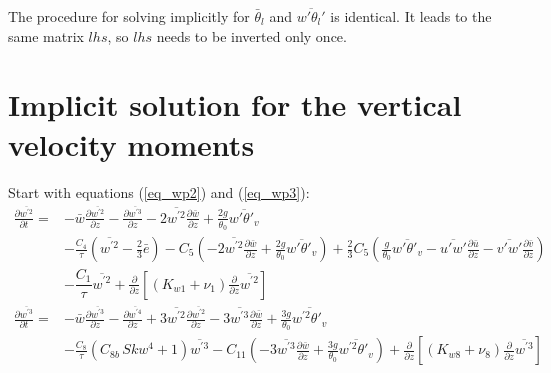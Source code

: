 \documentclass[11pt,fleqn]{article}
\newcommand{\ptlder}[2]{\frac{\partial #1}{\partial #2}}
\begin{document}
The procedure for solving implicitly for $\bar{\theta}_l$ 
and $\overline{w'\theta_l'}$ is identical. It leads to the same matrix
$lhs$, so $lhs$ needs to be inverted only once.

\section{Implicit solution for the vertical velocity moments}

Start with equations (\ref{eq_wp2}) and (\ref{eq_wp3}):
%
\begin{equation}
\label{eq_wp2b}
\begin{split}
\ptlder{\overline{w^{'2}}}{t} 
=& - \bar{w}\ptlder{\overline{w^{'2}}}{z}	 
   - \ptlder{\overline{w^{'3}}}{z} 
   - 2\overline{w^{'2}}\ptlder{\bar{w}}{z}
   + \frac{2g}{\theta_0} \overline{w'\theta'_v} \\
 & - \frac{C_4}{\tau} \left( \overline{w^{'2}} -\frac{2}{3}\bar{e} \right)
   - C_5 
     \left(
       - 2\overline{w^{'2}}\ptlder{\bar{w}}{z}
       + \frac{2g}{\theta_0} \overline{w'\theta'_v}
     \right)
   + \frac{2}{3} C_5
     \left(
       \frac{g}{\theta_0} \overline{w'\theta'_v} 
       - \overline{u'w'}\ptlder{\bar{u}}{z} 
       - \overline{v'w'}\ptlder{\bar{v}}{z} 
     \right) \\
 & - \dfrac{C_1}{\tau} \overline{w^{'2}} 
   + \ptlder{}{z} \left[ \left( K_{w1} + \nu_1 \right)
                         \ptlder{}{z} \overline{w^{'2}} 
                  \right]
\end{split}
\end{equation}
%
\begin{equation}
\label{eq_wp3b}
\begin{split}
\ptlder{\overline{w^{'3}}}{t}
= & - \bar{w}\ptlder{\overline{w^{'3}}}{z}
    - \ptlder{\overline{w^{'4}}}{z} 
    + 3\overline{w^{'2}}\ptlder{\overline{w^{'2}}}{z}
    - 3\overline{w^{'3}}\ptlder{\bar{w}}{z}
    + \frac{3g}{\theta_0} \overline{w^{'2}\theta'_v} \\
  & - \frac{C_8}{\tau}\left( C_{8b} \, Skw^4 + 1 \right) \overline{w^{'3}}
    - C_{11} \left(
                - 3 \overline{w^{'3}}\ptlder{\bar{w}}{z}
                + \frac{3g}{\theta_0} \overline{w^{'2}\theta'_v}
             \right)
    + \ptlder{}{z} \left[ \left( K_{w8} + \nu_8 \right)
                          \ptlder{}{z} \overline{w^{'3}} 
                   \right]
\end{split}
\end{equation}
\end{document}
